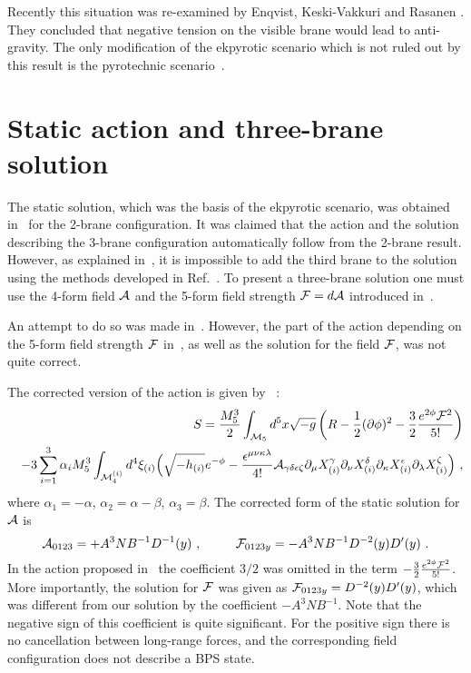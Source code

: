 \documentclass[a4paper,12pt]{article}
\begin{document}
Recently this situation was re-examined by Enqvist, Keski-Vakkuri and Rasanen \cite{Enqvist:2001zk}. They concluded that negative tension  on the visible brane would lead to anti-gravity. The only modification of the ekpyrotic scenario which is not ruled out by this result is the pyrotechnic scenario~\cite{KKL}.


\section{Static action and three-brane solution}

The static solution, which was the basis of the ekpyrotic scenario, was obtained in~\cite{universe} for the 2-brane configuration. It was claimed \cite{KOST,Khoury:2001iy} that the action and the solution describing the 3-brane configuration automatically follow from the 2-brane result. However, as explained in~\cite{KKLT}, it is impossible to add the third brane to the solution  using the methods developed in Ref.~\cite{universe}. To present a three-brane solution one must use the 4-form field ${\cal A}$ and the 5-form field strength ${\cal F}=d{\cal A}$ introduced in~\cite{BKV}.

An attempt to do so was made in~\cite{KOST}. However, the part of the action depending on the 5-form field strength ${\cal F}$   in~\cite{KOST},  as well as the solution for the field ${\cal F}$, was not quite correct. 

The corrected  version of the action  is given by ~\cite{KKLT}:
\begin{eqnarray}   
 & & S=\frac{M_5^3}{2}\int_{{\cal M}_5}   
d^5x\sqrt{-g}\left(R-\frac{1}{2}(\partial\phi)^2-{3\over   
2}\frac{e^{2\phi}{\cal   
F}^2}{5!}\right) \\   
& &-3\sum_{i=1}^3\alpha_iM_5^3\int_{{\cal M}_4^{(i)}}   
d^4\xi_{(i)}\Bigl(\sqrt{-h_{(i)}}e^{-\phi}   
 -\frac{\epsilon^{\mu\nu\kappa\lambda}}{4!}{\cal   
A}_{\gamma\delta\epsilon\zeta}   
\partial_{\mu}X^{\gamma}_{(i)}\partial_{\nu}X^{\delta}_{(i)}   
\partial_{\kappa}X^{\epsilon}_{(i)}\partial_{\lambda}X^{\zeta}_{(i)}\Bigr) \ ,   
\label{eq:5daction}   
\end{eqnarray}   
where $\alpha_1= -\alpha $, $\alpha_2= \alpha-\beta$, $\alpha_3=\beta$.   
The corrected form of the static solution for ${\cal A}$ is   
\begin{equation}   
{\cal A}_{0123}= + A^3 N B^{-1} D^{-1}(y)      \ ,  \ \ \ \ \ \ \ \   
             {\cal F}_{0123y}= - A^3  N B^{-1} D^{-2}(y) D'(y) \ .   
 \label{correct}   
\end{equation} 
In the action proposed in~\cite{KOST} the coefficient $3/2$ was omitted in the term $-{3\over 2}\frac{e^{2\phi}{\cal   
F}^2}{5!}$. More importantly, the solution for ${\cal   
F}$ was given as ${\cal F}_{0123y}= D^{-2}(y) D'(y)$, which was different from our solution by the coefficient $- A^3  N B^{-1}$. Note that the negative sign of this coefficient is quite significant. For the positive sign there is no cancellation between long-range forces, and the corresponding field configuration does not describe a BPS state.
\end{document}
